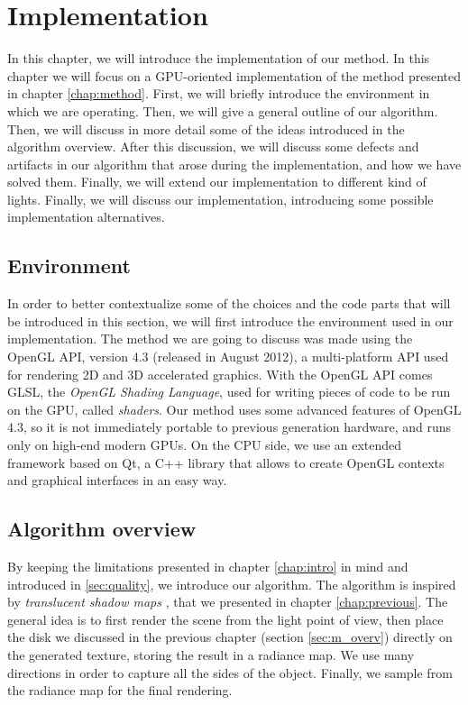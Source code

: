 \chapter{Implementation}
\label{chap:implementation}
In this chapter, we will introduce the implementation of our method. In this chapter we will focus on a GPU-oriented implementation of the method presented in chapter \ref{chap:method}. First, we will briefly introduce the environment in which we are operating. Then, we will give a general outline of our algorithm. Then, we will discuss in more detail some of the ideas introduced in the algorithm overview. After this discussion, we will discuss some defects and artifacts in our algorithm that arose during the implementation, and how we have solved them. Finally, we will extend our implementation to different kind of lights. Finally, we will discuss our implementation, introducing some possible implementation alternatives.

\section{Environment}

In order to better contextualize some of the choices and the code parts that will be introduced in this section, we will first introduce the environment used in our implementation. The method we are going to discuss was made using the OpenGL API, version 4.3 (released in August 2012), a multi-platform API used for rendering 2D and 3D accelerated graphics. With the OpenGL API comes GLSL, the \emph{OpenGL Shading Language}, used for writing pieces of code to be run on the GPU, called \emph{shaders}. Our method uses some advanced features of OpenGL 4.3, so it is not immediately portable to previous generation hardware, and runs only on high-end modern GPUs. On the CPU side, we use an extended framework based on Qt, a C++ library that allows to create OpenGL contexts and graphical interfaces in an easy way.

\section{Algorithm overview}

By keeping the limitations presented in chapter \ref{chap:intro} in mind and introduced in \ref{sec:quality}, we introduce our algorithm. The algorithm is inspired by \emph{translucent shadow maps} \citep{Dachsbacher:2003:TSM:882404.882433}, that we presented in chapter \ref{chap:previous}. The general idea is to first render the scene from the light point of view, then place the disk we discussed in the previous chapter (section \ref{sec:m_overv}) directly on the generated texture, storing the result in a radiance map. We use many directions in order to capture all the sides of the object. Finally, we sample from the radiance map for the final rendering.

